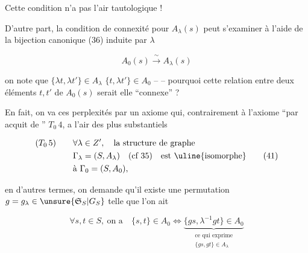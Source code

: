 
Cette condition n'a pas l'air tautologique !

D'autre part, la condition de connexité pour $A_\lambda(s)$ peut s'examiner à l'aide de la bijection canonique (36) induite par $\lambda$

\[
A_0(s)\xrightarrow{\ \sim\ } A_\lambda(s)
\]

on note que $\{\lambda t,\lambda t'\}\in A_\lambda$  $\{t,\lambda t'\}\in A_0$ -- -- pourquoi cette relation  entre deux éléments $t,t'$ de $A_0(s)$ serait elle ``connexe'' ?


En fait, on va  ces perplexités par un axiome qui, contrairement à l'axiome ``par acquit de '' $T_0\,4$, a l'air des plus substantiels

\[
\begin{aligned}
(T_0\,5)\qquad &\forall\lambda\in Z',\quad\text{la structure de graphe}\\
&\Gamma_\lambda=(S,A_\lambda)\quad(\text{cf }35)\quad\text{est \uline{isomorphe}}\\
&\text{à }\Gamma_0=(S,A_0),
\end{aligned}\tag*{$(41)$}
\]

en d'autres termes, on demande qu'il existe une permutation $g=g_\lambda\in\unsure{\mathfrak S_S|G_S}$ telle que l'on ait

\[
\forall s,t\in S,\ \text{on a}\quad \{s,t\}\in A_0\Longleftrightarrow
 \underbrace{\{gs,\lambda^{-1}gt\}\in A_0}_{\substack{\text{ce qui exprime}\\\{gs,gt\}\in A_\lambda}}
\tag*{$(42)$}
\]

